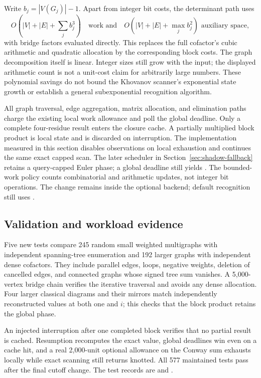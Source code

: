 Write $b_j=|V(G_j)|-1$.  Apart from integer bit costs, the determinant path
uses
\[
 O\!\left(|V|+|E|+\sum_j b_j^3\right)
 \quad\text{work and}\quad
 O\!\left(|V|+|E|+\max_j b_j^2\right)\text{ auxiliary space},
\]
with bridge factors evaluated directly.  This replaces the full cofactor's
cubic arithmetic and quadratic allocation by the corresponding block costs.
The graph decomposition itself is linear.  Integer sizes still grow with
the input; the displayed arithmetic count is not a unit-cost claim for
arbitrarily large numbers.  These polynomial savings do not bound the
Khovanov scanner's exponential state growth or establish a general
subexponential recognition algorithm.

All graph traversal, edge aggregation, matrix allocation, and elimination
paths charge the existing local work allowance and poll the global deadline.
Only a complete four-residue result enters the closure cache.  A partially
multiplied block product is local state and is discarded on interruption.
The implementation measured in this section disables observations on local
exhaustion and continues the same exact capped scan.  The later scheduler in
Section~\ref{sec:shadow-fallback} retains a query-capped Euler phase; a global
deadline still yields .  The
bounded-work policy counts combinatorial and arithmetic updates, not integer
bit operations.  The change remains inside the optional 
backend; default recognition still uses .

\subsection{Validation and workload evidence}

Five new tests compare 245 random small weighted multigraphs with independent
spanning-tree enumeration and 192 larger graphs with independent dense
cofactors.  They include parallel edges, loops, negative weights, deletion
of cancelled edges, and connected graphs whose signed tree sum vanishes.
A 5,000-vertex bridge chain verifies the iterative traversal and avoids
any dense allocation.  Four larger classical diagrams and their mirrors
match independently reconstructed values at both one and $i$; this checks
that the block product retains the global phase.

An injected interruption after one completed block verifies that no partial
result is cached.  Resumption recomputes the exact value, global deadlines
win even on a cache hit, and a real 2,000-unit optional allowance on the
Conway sum exhausts locally while exact scanning still returns knotted.
All 577 maintained tests pass after the final cutoff change.
The test records are  and
.

